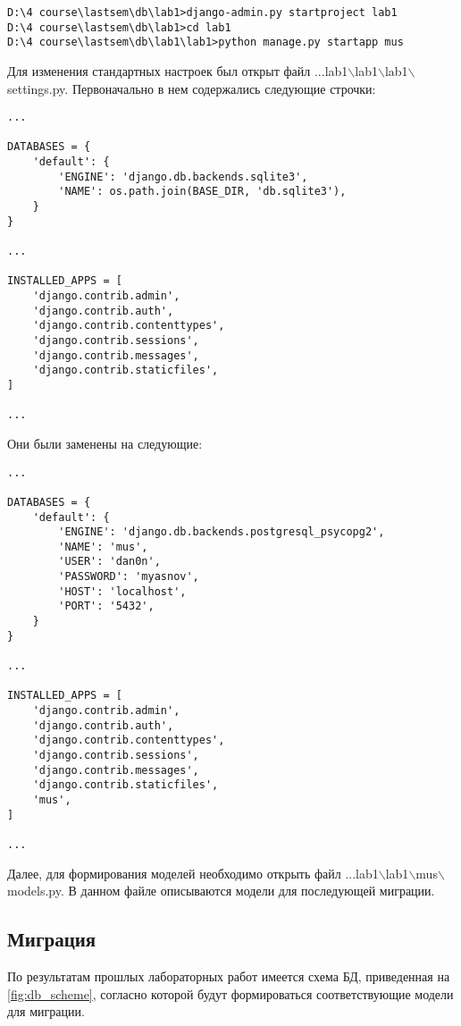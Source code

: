 \begin{lstlisting}[caption=Создание проекта]
D:\4 course\lastsem\db\lab1>django-admin.py startproject lab1
D:\4 course\lastsem\db\lab1>cd lab1
D:\4 course\lastsem\db\lab1\lab1>python manage.py startapp mus
\end{lstlisting}

Для изменения стандартных настроек был открыт файл ...lab1$\backslash$lab1$\backslash$lab1$\backslash$settings.py. Первоначально в нем содержались следующие строчки:

\begin{lstlisting}[caption=Часть settings.py до изменений]
...

DATABASES = {
	'default': {
		'ENGINE': 'django.db.backends.sqlite3',
		'NAME': os.path.join(BASE_DIR, 'db.sqlite3'),
	}
}

...

INSTALLED_APPS = [
	'django.contrib.admin',
	'django.contrib.auth',
	'django.contrib.contenttypes',
	'django.contrib.sessions',
	'django.contrib.messages',
	'django.contrib.staticfiles',
]

...
\end{lstlisting}

Они были заменены на следующие:

\begin{lstlisting}[caption=Часть settings.py после изменений]
...

DATABASES = {
	'default': {
		'ENGINE': 'django.db.backends.postgresql_psycopg2',
		'NAME': 'mus',
		'USER': 'dan0n',
		'PASSWORD': 'myasnov',
		'HOST': 'localhost',
		'PORT': '5432',
	}
}

...

INSTALLED_APPS = [
	'django.contrib.admin',
	'django.contrib.auth',
	'django.contrib.contenttypes',
	'django.contrib.sessions',
	'django.contrib.messages',
	'django.contrib.staticfiles',
	'mus',
]

...
\end{lstlisting}

Далее, для формирования моделей необходимо открыть файл ...lab1$\backslash$lab1$\backslash$mus$\backslash$models.py. В данном файле описываются модели для последующей миграции.

\subsection{Миграция}
По результатам прошлых лабораторных работ имеется схема БД, приведенная на \vref{fig:db_scheme}, согласно которой будут формироваться соответствующие модели для миграции.

